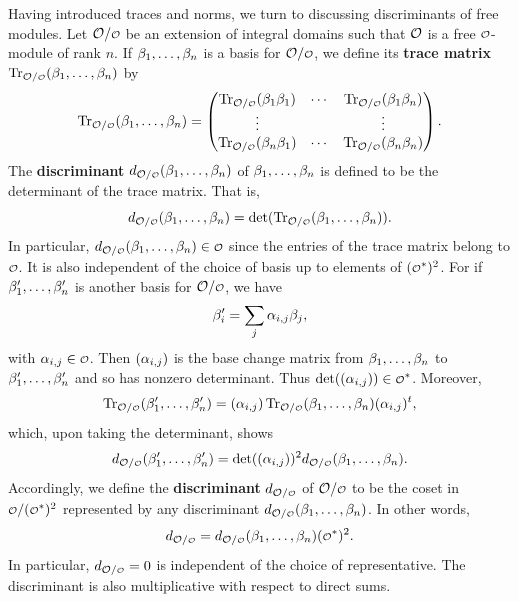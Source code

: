     Having introduced traces and norms, we turn to discussing discriminants of free modules. Let \(\mc{O}/\smc{O}\) be an extension of integral domains such that \(\mathcal{O}\) is a free \(\smc{O}\)-module of rank \(n\). If \(\beta_{1},\ldots,\beta_{n}\) is a basis for \(\mc{O}/\smc{O}\), we define its \textbf{trace matrix} \(\Trace_{\mc{O}/\smc{O}}(\b_{1},\ldots,\b_{n})\) by
    \[
      \Trace_{\mc{O}/\smc{O}}(\b_{1},\ldots,\b_{n}) = \begin{pmatrix} \Trace_{\mc{O}/\smc{O}}(\b_{1}\b_{1}) & \cdots & \Trace_{\mc{O}/\smc{O}}(\b_{1}\b_{n}) \\ \vdots & & \vdots \\ \Trace_{\mc{O}/\smc{O}}(\b_{n}\b_{1}) & \cdots & \Trace_{\mc{O}/\smc{O}}(\b_{n}\b_{n}) \end{pmatrix}.
    \]
    The \textbf{discriminant} \(d_{\mc{O}/\smc{O}}(\b_{1},\ldots,\b_{n})\) of \(\beta_{1},\ldots,\beta_{n}\) is defined to be the determinant of the trace matrix. That is,
    \[
      d_{\mc{O}/\smc{O}}(\b_{1},\ldots,\b_{n}) = \det(\Trace_{\mc{O}/\smc{O}}(\b_{1},\ldots,\b_{n})).
    \]
    In particular, \(d_{\mc{O}/\smc{O}}(\b_{1},\ldots,\b_{n}) \in \smc{O}\) since the entries of the trace matrix belong to \(\smc{O}\). It is also independent of the choice of basis up to elements of \((\smc{O}^{\ast})^{2}\). For if \(\beta_{1}',\ldots,\beta_{n}'\) is another basis for \(\mc{O}/\smc{O}\), we have
    \[
      \beta_{i}' = \sum_{j}\alpha_{i,j}\beta_{j},
    \]
    with \(\a_{i,j} \in \smc{O}\). Then \((\alpha_{i,j})\) is the base change matrix from \(\beta_{1},\ldots,\beta_{n}\) to \(\beta_{1}',\ldots,\beta_{n}'\) and so has nonzero determinant. Thus \(\det((\a_{i,j})) \in \smc{O}^{\ast}\). Moreover,
    \[
      \Trace_{\mc{O}/\smc{O}}(\b_{1}',\ldots,\b_{n}') = (\a_{i,j})\Trace_{\mc{O}/\smc{O}}(\b_{1},\ldots,\b_{n})(\a_{i,j})^{t},
    \]
    which, upon taking the determinant, shows
    \begin{equation}\label{equ:base_change_discriminant}
      d_{\mc{O}/\smc{O}}(\b_{1}',\ldots,\b_{n}') = \det((\a_{i,j}))^{2}d_{\mc{O}/\smc{O}}(\b_{1},\ldots,\b_{n}).
    \end{equation}
    Accordingly, we define the \textbf{discriminant} \(d_{\mc{O}/\smc{O}}\) of \(\mc{O}/\smc{O}\) to be the coset in \(\smc{O}/(\smc{O}^{\ast})^{2}\) represented by any discriminant \(d_{\mc{O}/\smc{O}}(\b_{1},\ldots,\b_{n})\). In other words,
    \[
      d_{\mc{O}/\smc{O}} = d_{\mc{O}/\smc{O}}(\b_{1},\ldots,\b_{n})(\smc{O}^{\ast})^{2}.
    \]
    In particular, \(d_{\mc{O}/\smc{O}} = 0\) is independent of the choice of representative. The discriminant is also multiplicative with respect to direct sums.

